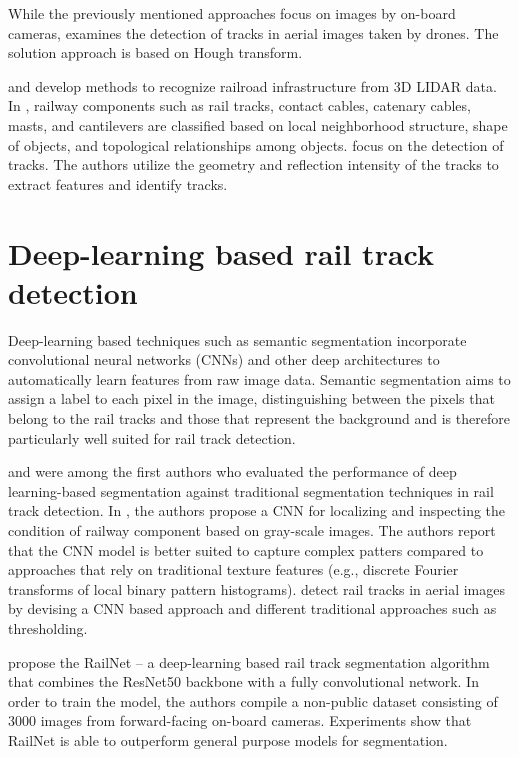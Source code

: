 \documentclass[Master,MDS,english]{BASE/twbook} %
\begin{document}
While the previously mentioned approaches focus on images by on-board cameras, \cite{7952544} examines the detection of tracks in aerial images taken by drones. The solution approach is based on Hough transform.

\citep{rs71114916} and \citep{6783695} develop methods to recognize railroad infrastructure from 3D LIDAR data.
In \citep{rs71114916}, railway components such as rail tracks, contact cables, catenary cables, masts, and cantilevers are classified based on local neighborhood structure, shape of objects, and topological relationships among objects. 
\citep{6783695} focus on the detection of tracks. The authors utilize the geometry and reflection intensity of the tracks to
extract features and identify tracks.


\section{Deep-learning based rail track detection}

Deep-learning based techniques such as semantic segmentation incorporate convolutional neural networks (CNNs) and other deep architectures to automatically learn features from raw image data. Semantic segmentation aims to assign a label to each pixel in the image, distinguishing between the pixels that belong to the rail tracks and those that represent the background and is therefore particularly well suited for rail track detection. 

\cite{7350873} and \cite{8517865} were among the first authors who evaluated the performance of deep learning-based segmentation against traditional segmentation techniques in rail track detection. 
In \cite{7350873}, the authors propose a CNN for localizing and inspecting the condition of railway component based on gray-scale images. The authors report that the CNN model is better suited to capture complex patters compared to approaches that rely on traditional texture features (e.g., discrete Fourier transforms of local binary pattern histograms). 
\cite{8517865} detect rail tracks in aerial images by devising a CNN based approach and different traditional approaches such as thresholding. 

\cite{8859360} propose the RailNet -- a deep-learning based rail track segmentation algorithm that combines the ResNet50 backbone with a fully convolutional network. In order to train the model, the authors compile a non-public dataset consisting of 3000 images from forward-facing on-board cameras. Experiments show that RailNet is able to outperform general purpose models for segmentation.
\end{document}
